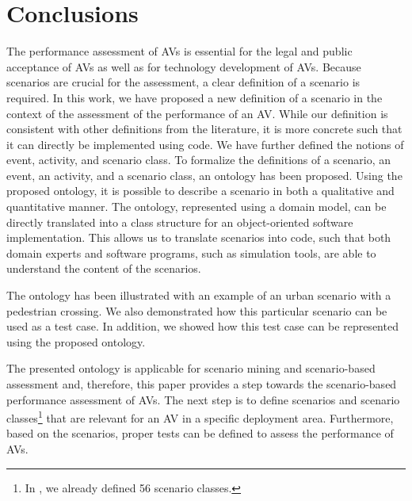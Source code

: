\cbstart
\section{Conclusions}
\label{sec:conclusion}

The performance assessment of AVs is essential for the legal and public acceptance of AVs as well as for technology development of AVs. 
Because scenarios are crucial for the assessment, a clear definition of a scenario is required.
In this work, we have proposed a new definition of a scenario in the context of the assessment of the performance of an AV. 
\cbstartc 
While our definition is consistent with other definitions from the literature, it is more concrete such that it can directly be implemented using code.
We have further defined the notions of event, activity, and scenario class. 
To formalize the definitions of a scenario, an event, an activity, and a scenario class, an ontology has been proposed. Using the proposed ontology, it is possible to describe a scenario in both a qualitative and quantitative manner. The ontology, represented using a domain model, can be directly translated into a class structure for an object-oriented software implementation. This allows us to translate scenarios into code, such that both domain experts and software programs, such as simulation tools, are able to understand the content of the scenarios. 

\cbstart
The ontology has been illustrated with an example of an urban scenario with a pedestrian crossing. 
We also demonstrated how this particular scenario can be used as a test case. In addition, we showed how this test case can be represented using the proposed ontology.
\cbend

The presented ontology is applicable for scenario mining \cite{paardekooper2019dataset6000km} and scenario-based assessment \cite{elrofai2018scenario} and, therefore, this paper provides a step towards the scenario-based performance assessment of AVs. The next step is to define scenarios and scenario classes\footnote{\cbstart In \cite{degelder2019scenarioclasses}, we already defined 56 scenario classes.\cbend} that are relevant for an AV in a specific deployment area. Furthermore, based on the scenarios, proper tests can be defined to assess the performance of AVs. 
\cbend
